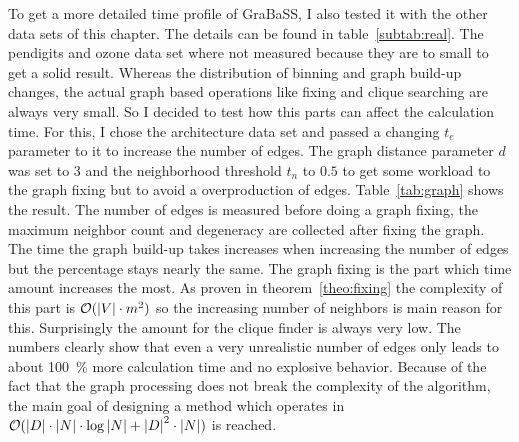 To get a more detailed time profile of GraBaSS, I also tested it with the other data sets of this chapter. The details can be found in table~\ref{subtab:real}. The pendigits and ozone data set where not measured because they are to small to get a solid result. Whereas the distribution of binning and graph build-up changes, the actual graph based operations like fixing and clique searching are always very small. So I decided to test how this parts can affect the calculation time. For this, I chose the architecture data set and passed a changing $t_e$ parameter to it to increase the number of edges. The graph distance parameter $d$ was set to $3$ and the neighborhood threshold $t_n$ to $0.5$ to get some workload to the graph fixing but to avoid a overproduction of edges. Table~\ref{tab:graph} shows the result. The number of edges is measured before doing a graph fixing, the maximum neighbor count and degeneracy are collected after fixing the graph. The time the graph build-up takes increases when increasing the number of edges but the percentage stays nearly the same. The graph fixing is the part which time amount increases the most. As proven in theorem~\ref{theo:fixing} the complexity of this part is $\mathcal{O} ( \left|V\right| \cdot m^2 )$ so the increasing number of neighbors is main reason for this. Surprisingly the amount for the clique finder is always very low. The numbers clearly show that even a very unrealistic number of edges only leads to about \SI{100}{\percent} more calculation time and no explosive behavior. Because of the fact that the graph processing does not break the complexity of the algorithm, the main goal of designing a method which operates in $\mathcal{O} ( \left|D\right| \cdot \left|N\right| \cdot \log{\left|N\right|} + \left|D\right|^2 \cdot \left|N\right| )$ is reached.

